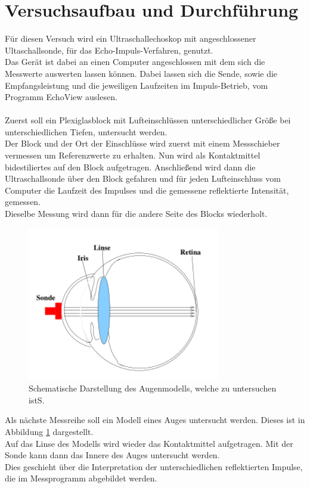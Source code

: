 
\section{Versuchsaufbau und Durchführung}

\noindent
Für diesen Versuch wird ein Ultraschallechoskop mit angeschlossener Ultaschallsonde, für das Echo-Impuls-Verfahren, genutzt.\\
Das Gerät ist dabei an einen Computer angeschlossen mit dem sich die Messwerte auswerten lassen können.
Dabei lassen sich die Sende, sowie die Empfangsleistung und die jeweiligen Laufzeiten im Impuls-Betrieb, vom Programm EchoView auslesen.\\\\

Zuerst soll ein Plexiglasblock mit Lufteinschlüssen unterschiedlicher Größe bei unterschiedlichen Tiefen, untersucht werden.\\
Der Block und der Ort der Einschlüsse wird zuerst mit einem Messschieber vermessen um Referenzwerte zu erhalten.
Nun wird als Kontaktmittel bidestiliertes auf den Block aufgetragen. 
Anschließend wird dann die Ultraschallsonde über den Block gefahren und für jeden Lufteinschluss vom Computer die Laufzeit des Impulses und die gemessene reflektierte Intensität, gemessen.\\
Dieselbe Messung wird dann für die andere Seite des Blocks wiederholt.

\begin{figure}
    \centering
    \includegraphics[width=0.75\textwidth]{latex/images/auge.PNG}
    \caption{Schematische Darstellung des Augenmodells, welche zu untersuchen istS\protect \cite{US1}.}
    \label{img:auge}
\end{figure}

\noindent
Als nächste Messreihe soll ein Modell eines Auges untersucht werden. Dieses ist in Abbildung \ref{img:auge} dargestellt.\\
Auf das Linse des Modells wird wieder das Kontaktmittel aufgetragen. Mit der Sonde kann dann das Innere des Auges untersucht werden.\\
Dies geschieht über die Interpretation der unterschiedlichen reflektierten Impulse, die im Messprogramm abgebildet werden.

